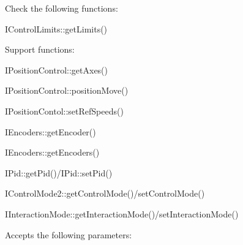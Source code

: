 Check the following functions\+: \begin{DoxyItemize}
\item I\+Control\+Limits\+::get\+Limits()\end{DoxyItemize}
Support functions\+: \begin{DoxyItemize}
\item I\+Position\+Control\+::get\+Axes() \item I\+Position\+Control\+::position\+Move() \item I\+Position\+Contol\+::set\+Ref\+Speeds() \item I\+Encoders\+::get\+Encoder() \item I\+Encoders\+::get\+Encoders() \item I\+Pid\+::get\+Pid()/\+I\+Pid\+::set\+Pid() \item I\+Control\+Mode2\+::get\+Control\+Mode()/set\+Control\+Mode() \item I\+Interaction\+Mode\+::get\+Interaction\+Mode()/set\+Interaction\+Mode()\end{DoxyItemize}
Accepts the following parameters\+: \tabulinesep=1mm
